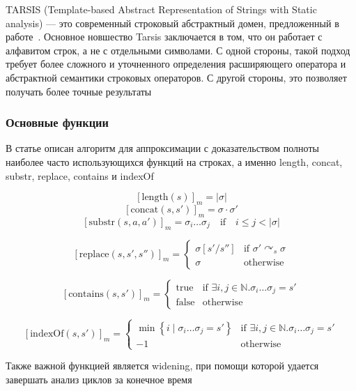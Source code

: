 TARSIS (Template-based Abstract Representation of Strings with Static analysis) — это современный строковый абстрактный домен, предложенный в работе~\cite{tarsis2021}. Основное новшество Tarsis заключается в том, что он работает с алфавитом строк, а не с отдельными символами. С одной стороны, такой подход требует более сложного и уточненного определения расширяющего оператора и абстрактной семантики строковых операторов. С другой стороны, это позволяет получать более точные результаты

\subsubsection*{Основные функции}
В статье описан алгоритм для аппроксимации с доказательством полноты наиболее часто использующихся функций на строках, а именно length, concat, substr, replace, contains и indexOf

$$\left[ \text{length}(s) \right]_{m} = |\sigma|$$
$$\left[ \text{concat}(s, s') \right]_{m} = \sigma \cdot \sigma'$$
$$\left[ \text{substr}(s, a, a') \right]_{m} = \sigma_i \dots \sigma_j \quad \text{if} \quad i \leq j < |\sigma|$$


\[
\left[ \text{replace}(s, s', s'') \right]_{m} = 
\begin{cases}
\sigma \left[ s' / s'' \right] & \text{if } \sigma'  \curvearrowright_s \sigma \\
\sigma & \text{otherwise}
\end{cases}
\]

$$\left[ \text{contains}(s, s') \right]_{m} = 
\begin{cases}
\text{true} & \text{if } \exists i, j \in \mathbb{N}. \sigma_i \dots \sigma_j = s' \\
\text{false} & \text{otherwise}
\end{cases}$$

$$\left[ \text{indexOf}(s, s') \right]_{m} = 
\begin{cases}
\min \left\{ i \mid \sigma_i \dots \sigma_j = s' \right\} & \text{if } \exists i, j \in \mathbb{N}. \sigma_i \dots \sigma_j = s' \\
-1 & \text{otherwise}
\end{cases}$$

Также важной функцией является widening, при помощи которой удается завершать анализ циклов за конечное время